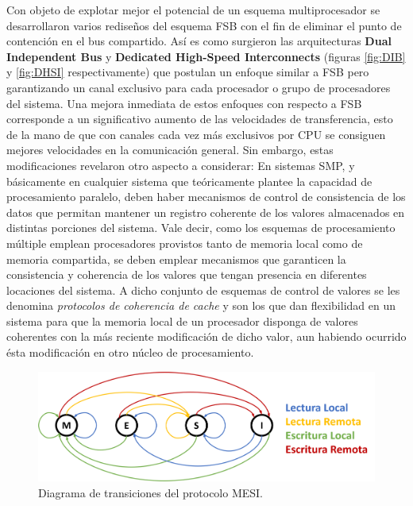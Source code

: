 Con objeto de explotar mejor el potencial de un esquema multiprocesador se desarrollaron varios rediseños del esquema FSB con el fin de eliminar el punto de contención en el bus compartido. Así es como surgieron las arquitecturas \textbf{Dual Independent Bus} y \textbf{Dedicated High-Speed Interconnects} (figuras \ref{fig:DIB} y \ref{fig:DHSI} respectivamente) que postulan un enfoque similar a FSB pero garantizando un canal exclusivo para cada procesador o grupo de procesadores del sistema. Una mejora inmediata de estos enfoques con respecto a FSB corresponde a un significativo aumento de las velocidades de transferencia, esto de la mano de que con canales cada vez más exclusivos por CPU se consiguen mejores velocidades en la comunicación general. Sin embargo, estas modificaciones revelaron otro aspecto a considerar: En sistemas SMP, y básicamente en cualquier sistema que teóricamente plantee la capacidad de procesamiento paralelo, deben haber mecanismos de control de consistencia de los datos que permitan mantener un registro coherente de los valores almacenados en distintas porciones del sistema. Vale decir, como los esquemas de procesamiento múltiple emplean procesadores provistos tanto de memoria local como de memoria compartida, se deben emplear mecanismos que garanticen la consistencia y coherencia de los valores que tengan presencia en diferentes locaciones del sistema. A dicho conjunto de esquemas de control de valores se les denomina \emph{protocolos de coherencia de cache} y son los que dan flexibilidad en un sistema para que la memoria local de un procesador disponga de valores coherentes con la más reciente modificación de dicho valor, aun habiendo ocurrido ésta modificación en otro núcleo de procesamiento.

\begin{figure}[!h]
	\centering
	\includegraphics[scale=0.3]{imagenes/MESI.png}
	\caption{Diagrama de transiciones del protocolo MESI.}
	\label{fig:MESI}
\end{figure}

